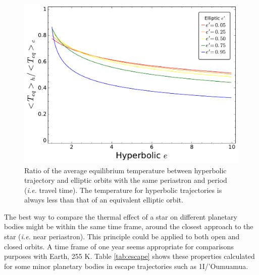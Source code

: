 \documentclass[a4paper,fleqn,usenatbib]{mnras}
\begin{document}
\begin{figure}
\includegraphics[width=\columnwidth]{f4.pdf}
\caption{Ratio of the average equilibrium temperature between hyperbolic trajectory and elliptic orbits with the same periastron and period (\emph{i.e.} travel time). The temperature for hyperbolic trajectories is always less than that of an equivalent elliptic orbit.}
\label{fig4}
\end{figure}

The best way to compare the thermal effect of a star on different planetary bodies might be within the same time frame, around the closest approach to the star (\emph{i.e.} near periastron). This principle could be applied to both open and closed orbits. A time frame of one year seems appropriate for comparisons purposes with Earth, 255 K. Table \ref{tab:escape} shows these properties calculated for some minor planetary bodies in escape trajectories such as 1I/'Oumuamua.
\end{document}
